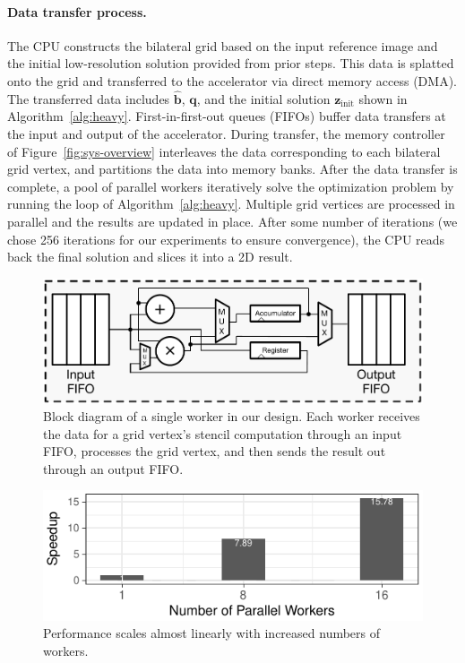 \paragraph{Data transfer process. }The CPU constructs the bilateral grid based on the input reference image and the initial low-resolution solution provided from prior steps.
This data is splatted onto the grid and transferred to the accelerator via direct memory access (DMA).
The transferred data includes $\hat{\mathbf{b}}$, $\mathbf{q}$, and the initial solution $\mathbf{z}_{\mathrm{init}}$ shown in Algorithm~\ref{alg:heavy}.
First-in-first-out queues (FIFOs) buffer data transfers at the input and output of the accelerator.
During transfer, the memory controller of Figure~\ref{fig:sys-overview} interleaves the data corresponding to each bilateral grid vertex, and partitions the data into memory banks.
After the data transfer is complete, a pool of parallel workers iteratively solve the optimization problem by running the loop of Algorithm~\ref{alg:heavy}.
Multiple grid vertices are processed in parallel and the results are updated in place.
After some number of iterations (we chose 256 iterations for our experiments to ensure convergence), the CPU reads back the final solution and slices it into a 2D result.

\begin{figure}[h]
\centering
\includegraphics[width=.5\columnwidth]{hfbs-figs/worker_microarchitecture.pdf}

\caption{Block diagram of a single worker in our design.
Each worker receives the data for a grid vertex's stencil computation through an input FIFO, processes the grid vertex, and then sends the result out through an output FIFO.
}
\label{fig:microarch-single-worker}

\end{figure}



\begin{figure}[h]
\centering
\includegraphics[width=.5\columnwidth]{hfbs-figs/worker_scaling.pdf}
\caption{Performance scales almost linearly with increased numbers of workers.}
\label{fig:worker-perf}
\end{figure}

